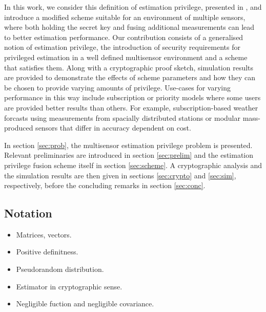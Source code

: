 \documentclass[conference]{IEEEtran}
\begin{document}
In this work, we consider this definition of estimation privilege, presented in \cite{risticCryptographicallyPrivilegedState2022}, and introduce a modified scheme suitable for an environment of multiple sensors, where both holding the secret key and fusing additional measurements can lead to better estimation performance. Our contribution consists of a generalised notion of estimation privilege, the introduction of security requirements for privileged estimation in a well defined multisensor environment and a scheme that satisfies them. Along with a cryptographic proof sketch, simulation results are provided to demonstrate the effects of scheme parameters and how they can be chosen to provide varying amounts of privilege. Use-cases for varying performance in this way include subscription or priority models where some users are provided better results than others. For example, subscription-based weather forcasts using measurements from spacially distributed stations or modular mass-produced sensors that differ in accuracy dependent on cost.

In section \ref{sec:prob}, the multisensor estimation privilege problem is presented. Relevant preliminaries are introduced in section \ref{sec:prelim} and the estimation privilege fusion scheme itself in section \ref{sec:scheme}. A cryptographic analysis and the simulation results are then given in sections \ref{sec:crypto} and \ref{sec:sim}, respectively, before the concluding remarks in section \ref{sec:conc}.

\subsection{Notation}\label{subsec:notation}
\begin{itemize}
  \item Matrices, vectors.
  \item Positive definitness.
  \item Pseudorandom distribution.
  \item Estimator in cryptographic sense.
  \item Negligible fuction and negligible covariance.
\end{itemize}

% 
%                                              
%                                              
%                                              
% 
\end{document}
